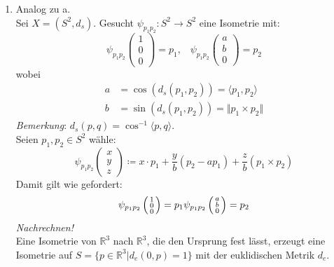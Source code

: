 \begin{problem}
\begin{enumerate}[label=(\alph*)]
    \item Analog zu a. \\
    Sei \( X = (S^2, d_s) \). Gesucht \( \psi_{p_1p_2}: S^2 \to S^2 \) eine Isometrie mit:
    \begin{equation*}
      \psi_{p_1p_2} \left(\begin{smallmatrix}
        1 \\ 0 \\ 0
      \end{smallmatrix} \right) = p_1\text{,} \quad
      \psi_{p_1p_2} \left(\begin{smallmatrix}
        a \\ b \\ 0
      \end{smallmatrix} \right) = p_2
    \end{equation*}	
    wobei 
    \begin{align*}
      a &= \cos(d_s(p_1,p_2)) = \langle p_1, p_2 \rangle \\
      b &= \sin (d_s(p_1,p_2)) = \Vert p_1 \times p_2 \Vert
    \end{align*}
    \emph{Bemerkung}: \( d_s(p,q) = \cos^{-1} \langle p,q \rangle \). \\
    Seien \( p_1, p_2 \in S^2 \) wähle:
    \begin{equation*}
      \psi_{p_1 p_2}\left(\begin{smallmatrix}
        x \\ y \\ z
      \end{smallmatrix} \right) \coloneqq x \cdot p_1 + \frac{y}{b} (p_2-ap_1) + \frac{z}{b}(p_1 \times p_2)
    \end{equation*}
    Damit gilt wie gefordert: 
    \begin{equation*}
      \psi_{p_1p_2}\left(\begin{smallmatrix}
        1\\ 0 \\ 0
      \end{smallmatrix} \right) = p_1 \\
      \psi_{p_1p_2}\left(\begin{smallmatrix}
        a \\ b \\ 0
      \end{smallmatrix} \right) = p_2
    \end{equation*}
    \emph{Nachrechnen!} \\
    Eine Isometrie von \( \mathbb{R}^3 \) nach \( \mathbb{R}^3 \), die den Ursprung fest lässt, erzeugt eine Isometrie auf \( S = \{ p \in \mathbb{R}^3 | d_e(0,p) = 1 \} \) mit der euklidischen Metrik \( d_e \). \\

\end{enumerate}
\end{problem}
